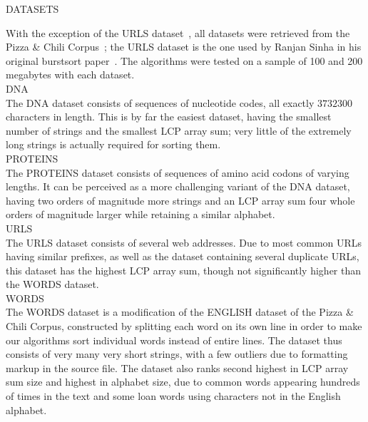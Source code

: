 {\sffamily\normalsize{\color{sciorange}DATASETS}}\vspace{-7mm}\small\\
 \footnotesize 
\begin{multicols}{3}
With the exception of the URLS dataset~\cite{sinha}, all datasets were retrieved from
the Pizza \& Chili Corpus~\cite{fn2005}; the URLS dataset is the one used by Ranjan Sinha
in his original burstsort paper~\cite{sw2008}. The algorithms were tested on a sample
of 100 and 200 megabytes with each dataset.\vspace{1.5mm}\\
{\sffamily\normalsize{\color{sciorange}DNA}}\small\\
\footnotesize 
The DNA dataset consists of sequences of nucleotide codes, all exactly $3732300$
characters in length.  This is by far the easiest dataset, having the smallest
number of strings and the smallest LCP array sum; very little of the extremely
long strings is actually required for sorting them.\vspace{1.5mm}\\
{\sffamily\normalsize{\color{sciorange}PROTEINS}}\small\\
\footnotesize 
The PROTEINS dataset consists of sequences of amino acid codons of varying
lengths.  It can be perceived as a more challenging variant of the DNA dataset,
having two orders of magnitude more strings and an LCP array sum four whole
orders of magnitude larger while retaining a similar alphabet.\vspace{1.5mm}\\
{\sffamily\normalsize{\color{sciorange}URLS}}\small\\
\footnotesize 
The URLS dataset consists of several web addresses.  Due to most common URLs
having similar prefixes, as well as the dataset containing several duplicate
URLs, this dataset has the highest LCP array sum, though not significantly
higher than the WORDS dataset.\vspace{1.5mm}\\
{\sffamily\normalsize{\color{sciorange}WORDS}}\small\\
\footnotesize 
The WORDS dataset is a modification of the ENGLISH dataset of the Pizza \& Chili
Corpus, constructed by splitting each word on its own line in order to make our
algorithms sort individual words instead of entire lines.  The dataset thus
consists of very many very short strings, with a few outliers due to formatting
markup in the source file.  The dataset also ranks second highest in LCP array
sum size and highest in alphabet size, due to common words appearing hundreds of
times in the text and some loan words using characters not in the English
alphabet.
\end{multicols}
